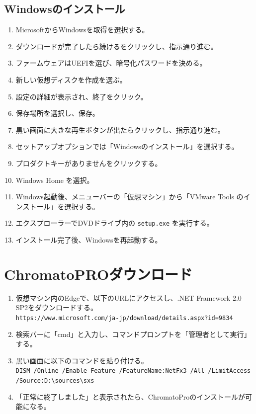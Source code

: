 \documentclass[lualatex,ja=standard]{bxjsarticle}
\begin{document}
\subsection{Windowsのインストール}
\begin{enumerate}[label=\arabic*.]
    \item MicrosoftからWindowsを取得を選択する。
    \item ダウンロードが完了したら続けるをクリックし、指示通り進む。
    \item ファームウェアはUEFIを選び、暗号化パスワードを決める。
    \item 新しい仮想ディスクを作成を選ぶ。
    \item 設定の詳細が表示され、終了をクリック。
    \item 保存場所を選択し、保存。
    \item 黒い画面に大きな再生ボタンが出たらクリックし、指示通り進む。
    \item セットアップオプションでは「Windowsのインストール」を選択する。
    \item プロダクトキーがありませんをクリックする。
    \item Windows Home を選択。
    \item Windows起動後、メニューバーの「仮想マシン」から「VMware Tools のインストール」を選択する。
    \item エクスプローラーでDVDドライブ内の \texttt{setup.exe} を実行する。
    \item インストール完了後、Windowsを再起動する。
\end{enumerate}

\section{ChromatoPROダウンロード}
\begin{enumerate}[label=\arabic*.]
    \item 仮想マシン内のEdgeで、以下のURLにアクセスし、.NET Framework 2.0 SP2をダウンロードする。\\
    \verb|https://www.microsoft.com/ja-jp/download/details.aspx?id=9834|
    
    \item 検索バーに「cmd」と入力し、コマンドプロンプトを「管理者として実行」する。
    
    \item 黒い画面に以下のコマンドを貼り付ける。\\
    \verb|DISM /Online /Enable-Feature /FeatureName:NetFx3 /All /LimitAccess /Source:D:\sources\sxs|
    
    \item 「正常に終了しました」と表示されたら、ChromatoProのインストールが可能になる。
\end{enumerate}
\end{document}
